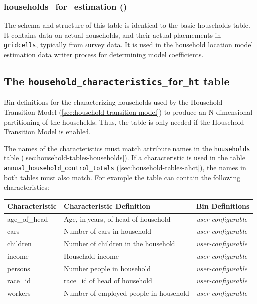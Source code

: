 \subsubsection{households_for_estimation () }

The schema and structure of this table is identical to the basic households
table. It contains data on actual households, and their actual placmements in
\verb|gridcells|, typically from survey data. It is used in the household
location model estimation data writer process for determining model
coefficients.

\subsection{The {\tt household_characteristics_for_ht} table}
\label{sec:household-tables-char-for-ht}

Bin definitions for the characterizing households used by the Household
Transition Model (\ref{sec:household-transition-model})
to produce an N-dimensional partitioning of the households. Thus, the table is only needed if the
Household Transition Model is enabled.

The names of the
characteristics must match
attribute names in the {\tt households} table (\ref{sec:household-tables-households}).
If a characteristic is used in the table {\tt annual_household_control_totals}
(\ref{sec:household-tables-ahct}), the names in both tables must also match.
For example the table can contain the following
characteristics:

\begin{tabular}{|l|p{2in}|p{3in}|}
\hline
\textbf{Characteristic}
&\textbf{Characteristic Definition}
&\textbf{Bin Definitions}
\\
\hline
age_of_head & Age, in years, of head of household  & \emph{user-configurable}
\\
\hline
cars &Number of cars in household & \emph{user-configurable}
\\
\hline
children &Number of children in the household & \emph{user-configurable}
\\
\hline
income &Household income  & \emph{user-configurable}
\\
\hline
persons &Number people in household & \emph{user-configurable}
\\
\hline
race_id &race_id of head of household & \emph{user-configurable}
\\
\hline
workers &Number of employed people in household & \emph{user-configurable}
\\
\hline

\end{tabular}


